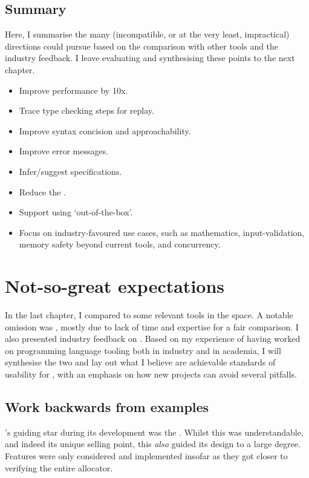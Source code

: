 \section{Summary}

Here, I summarise the many (incompatible, or at the very least, impractical)
directions  could pursue based on the comparison with other tools
and the industry feedback. I leave evaluating and synthesising these points
to the next chapter.
\begin{itemize}
    \item Improve performance by 10x.
    \item Trace type checking steps for replay.
    \item Improve syntax concision and approachability.
    \item Improve error messages.
    \item Infer/suggest specifications.
    \item Reduce the .
    \item Support using  `out-of-the-box'.
    \item Focus on industry-favoured use cases, such as mathematics,
        input-validation, memory safety beyond current tools, and concurrency.
\end{itemize}

\chapter{Not-so-great expectations}

\margintoc{}

In the last chapter, I compared  to some relevant tools in the space. A
notable omission was , mostly due to lack of time and expertise for a
fair comparison. I also presented industry feedback on . Based on my
experience of having worked on programming language tooling both in industry
and in academia, I will synthesise the two and lay out what I believe are
achievable standards of usability for , with an emphasis on how new
projects can avoid several pitfalls.

\section{Work backwards from examples}

's guiding star during its development was the . Whilst this was understandable, and indeed its unique selling
point, this \emph{also} guided its design to a large degree. Features were only
considered and implemented insofar as they got  closer to verifying the
entire allocator.

